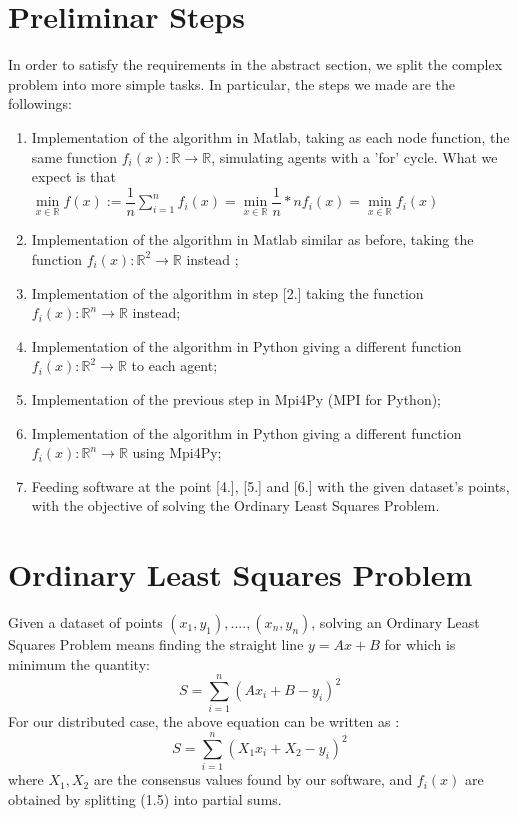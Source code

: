 \documentclass[a4paper,11pt,oneside]{book}
\begin{document}
\section{Preliminar Steps}
In order to satisfy the requirements in the abstract section, we split the complex problem into more simple tasks. In particular, the steps we made are the followings:
\begin{enumerate}
\item Implementation of the algorithm in Matlab, taking as each node function, the same function $f_i(x): \mathbb{R} \rightarrow \mathbb{R} $, simulating agents with a 'for' cycle. What we expect is that\\ $\min\limits_{x \in \mathbb{R}} f(x) := \dfrac{1}{n} \sum\limits_{i=1}^{n} f_i (x) = \min\limits_{x \in \mathbb{R}} \dfrac{1}{n}*{n}f_i(x) = \min\limits_{x \in \mathbb{R}}f_i(x)$ 
\item Implementation of the algorithm in Matlab similar as before, taking the function $f_i(x): \mathbb{R}^{2} \rightarrow \mathbb{R} $ instead ;
\item Implementation of the algorithm in step [2.] taking the function $f_i(x): \mathbb{R}^{n} \rightarrow \mathbb{R} $ instead;
\item Implementation of the algorithm in Python giving a different function $f_i(x): \mathbb{R}^{2} \rightarrow \mathbb{R} $ to each agent;
\item Implementation of the previous step in Mpi4Py (MPI for Python);
\item Implementation of the algorithm in Python giving a different function $f_i(x): \mathbb{R}^{n} \rightarrow \mathbb{R} $ using Mpi4Py;
\item Feeding software at the point [4.], [5.] and [6.] with the given dataset's points, with the objective of solving the Ordinary Least Squares Problem.     
\end{enumerate}

\newpage
\section{Ordinary Least Squares Problem}
Given a dataset of points $(x_1,y_1),....,(x_n,y_n)$, solving an Ordinary Least Squares Problem means finding the straight line $y = Ax + B$ for which is minimum the quantity:
\begin{equation}
S= \sum\limits_{i=1}^{n}(Ax_i + B - y_i)^2
\end{equation}
For our distributed case, the above equation can be written as : 
\begin{equation}
S= \sum\limits_{i=1}^{n}(X_1x_i + X_2 - y_i)^2
\end{equation}
where $X_1, X_2$ are the consensus values found by our software, and $f_i(x)$ are obtained by splitting (1.5) into partial sums.
\end{document}
